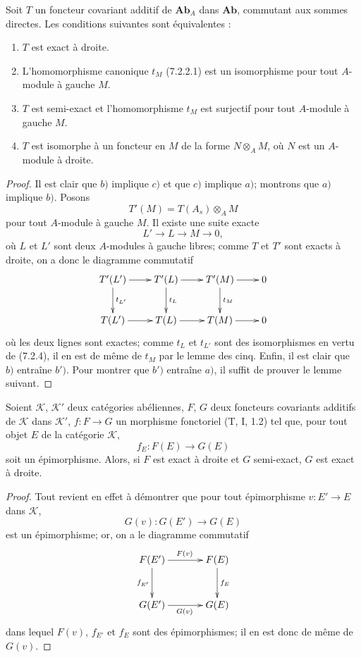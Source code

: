 \begin{proposition}[7.2.5]
Soit $T$ un foncteur covariant additif de $\mathbf{Ab}_A$ dans
$\mathbf{Ab}$, commutant aux sommes directes. Les conditions suivantes sont
équivalentes :
\begin{enumerate}
  \item[a)] $T$ est exact à droite.
  \item[b)] L'homomorphisme canonique $t_M$ (7.2.2.1) est un isomorphisme pour
    tout $A$-module à gauche $M$.
  \item[$b'$)] $T$ est semi-exact et l'homomorphisme $t_M$ est surjectif pour
    tout $A$-module à gauche $M$.
  \item[c)] $T$ est isomorphe à un foncteur en $M$ de la forme
    $N\otimes_A M$, où $N$ est un $A$-module à droite.
\end{enumerate}
\end{proposition}

\begin{proof}
Il est clair que $b)$ implique $c)$ et que $c)$ implique $a)$; montrons que
$a)$ implique $b)$.
Posons
\[
  T'(M)=T(A_s)\otimes_A M
\]
pour tout $A$-module à gauche $M$. Il existe une suite exacte
\[
  L'\longrightarrow L\longrightarrow M\longrightarrow0,
\]
où $L$ et $L'$ sont deux $A$-modules à gauche libres; comme $T$ et $T'$ sont
exacts à droite, on a donc le diagramme commutatif
\[
\xymatrix@C=22pt@R=25pt{
  T'(L')\ar[r]\ar[d]^{t_{L'}}
  &
  T'(L)\ar[r]\ar[d]^{t_L}
  &
  T'(M)\ar[r]\ar[d]^{t_M}
  &
  0
  \\
  T(L')\ar[r]
  &
  T(L)\ar[r]
  &
  T(M)\ar[r]
  &
  0
}
\]
où les deux lignes sont exactes; comme $t_L$ et $t_{L'}$ sont des
isomorphismes en vertu de (7.2.4), il en est de même de $t_M$ par le lemme des
cinq. Enfin, il est clair que $b)$ entraîne $b')$. Pour montrer que $b')$
entraîne $a)$, il suffit de prouver le lemme suivant.
\end{proof}

\begin{lemma}[7.2.5.1]
Soient $\mathcal K$, $\mathcal K'$ deux catégories abéliennes, $F$, $G$ deux
foncteurs covariants additifs de $\mathcal K$ dans $\mathcal K'$,
$f:F\to G$ un morphisme fonctoriel (T, I, 1.2) tel que, pour tout objet $E$
de la catégorie $\mathcal K$,
\[
  f_E:F(E)\longrightarrow G(E)
\]
soit un épimorphisme. Alors, si $F$ est exact à droite et $G$ semi-exact,
$G$ est exact à droite.
\end{lemma}

\begin{proof}
Tout revient en effet à démontrer que pour tout épimorphisme
$v:E'\to E$ dans $\mathcal K$,
\[
  G(v):G(E')\longrightarrow G(E)
\]
est un épimorphisme; or, on a le diagramme commutatif
\[
\xymatrix@C=35pt@R=30pt{
  F(E')\ar[r]^{F(v)}\ar[d]_{f_{E'}}
  &
  F(E)\ar[d]^{f_E}
  \\
  G(E')\ar[r]_{G(v)}
  &
  G(E)
}
\]
dans lequel $F(v)$, $f_{E'}$ et $f_E$ sont des épimorphismes; il en est donc
de même de $G(v)$.
\end{proof}

